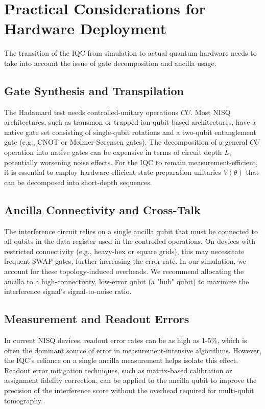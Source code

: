 \documentclass[conference]{IEEEtran}
\begin{document}
\section{Practical Considerations for Hardware Deployment}

The transition of the IQC from simulation to actual quantum hardware needs to take into account the issue of gate decomposition and ancilla usage.

\subsection{Gate Synthesis and Transpilation}

The Hadamard test needs controlled-unitary operations $CU$. Most NISQ architectures, such as transmon or trapped-ion qubit-based architectures, have a native gate set consisting of single-qubit rotations and a two-qubit entanglement gate (e.g., CNOT or Mølmer-Sørensen gates). The decomposition of a general $CU$ operation into native gates can be expensive in terms of circuit depth $L$, potentially worsening noise effects. For the IQC to remain measurement-efficient, it is essential to employ hardware-efficient state preparation unitaries $V(\theta)$ that can be decomposed into short-depth sequences.

\subsection{Ancilla Connectivity and Cross-Talk}

The interference circuit relies on a single ancilla qubit that must be connected to all qubits in the data register used in the controlled operations. On devices with restricted connectivity (e.g., heavy-hex or square grids), this may necessitate frequent SWAP gates, further increasing the error rate. In our simulation, we account for these topology-induced overheads. We recommend allocating the ancilla to a high-connectivity, low-error qubit (a "hub" qubit) to maximize the interference signal's signal-to-noise ratio.

\subsection{Measurement and Readout Errors}

In current NISQ devices, readout error rates can be as high as 1-5\%, which is often the dominant source of error in measurement-intensive algorithms. However, the IQC's reliance on a single ancilla measurement helps isolate this effect. Readout error mitigation techniques, such as matrix-based calibration or assignment fidelity correction, can be applied to the ancilla qubit to improve the precision of the interference score without the overhead required for multi-qubit tomography.
\end{document}
